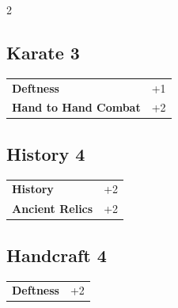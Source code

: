 \begin{multicols}{2}
\begin{tcolorbox}
\end{tcolorbox}

\begin{tcolorbox}
    \subsection*{Karate \hfill \small{3 }}
    \tcblower




\begin{tabular}{@{}ll@{}}
    \textbf{Deftness} & +1\\
    \textbf{Hand to Hand Combat} & +2\\
\end{tabular}


\end{tcolorbox}

\begin{tcolorbox}
    \subsection*{History \hfill \small{4 }}
    \tcblower




\begin{tabular}{@{}ll@{}}
    \textbf{History} & +2\\
    \textbf{Ancient Relics} & +2\\
\end{tabular}


\end{tcolorbox}

\begin{tcolorbox}
    \subsection*{Handcraft \hfill \small{4 }}
    \tcblower




\begin{tabular}{@{}ll@{}}
    \textbf{Deftness} & +2\\
\end{tabular}


\end{tcolorbox}
\end{multicols}
